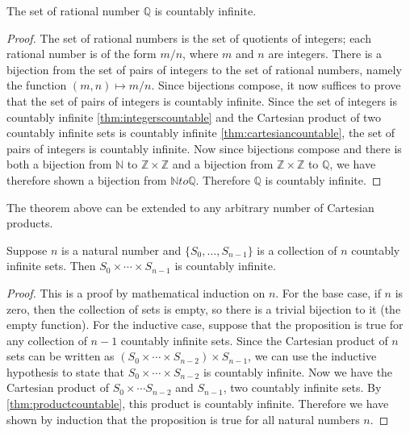 \begin{corollary}
  The set of rational number $\mathbb{Q}$ is countably infinite.
\end{corollary}
\begin{proof}
  The set of rational numbers is the set of quotients of integers; each rational number is of the form $m / n$, where $m$ and $n$ are integers.
  There is a bijection from the set of pairs of integers to the set of rational numbers, namely the function $(m, n) \mapsto m / n$.
  Since bijections compose, it now suffices to prove that the set of pairs of integers is countably infinite.
  Since the set of integers is countably infinite \autoref{thm:integerscountable} and the Cartesian product of two countably infinite sets is countably infinite \autoref{thm:cartesiancountable}, the set of pairs of integers is countably infinite.
  Now since bijections compose and there is both a bijection from $\mathbb{N}$ to $\mathbb{Z} \times \mathbb{Z}$ and a bijection from $\mathbb{Z} \times \mathbb{Z}$ to $\mathbb{Q}$, we have therefore shown a bijection from $\mathbb{N} to \mathbb{Q}$.
  Therefore $\mathbb{Q}$ is countably infinite.
\end{proof}

The theorem above can be extended to any arbitrary number of Cartesian products.

\begin{theorem}
  Suppose $n$ is a natural number and $\{S_0, \dotsc, S_{n - 1}\}$ is a collection of $n$ countably infinite sets.
  Then $S_0 \times \dotsb \times S_{n - 1}$ is countably infinite.
\end{theorem}
\begin{proof}
  This is a proof by mathematical induction on $n$.
  For the base case, if $n$ is zero, then the collection of sets is empty, so there is a trivial bijection to it (the empty function).
  For the inductive case, suppose that the proposition is true for any collection of $n - 1$ countably infinite sets.
  Since the Cartesian product of $n$ sets can be written as $(S_0 \times \dotsb \times S_{n - 2}) \times S_{n - 1}$, we can use the inductive hypothesis to state that $S_0 \times \dotsb \times S_{n - 2}$ is countably infinite.
  Now we have the Cartesian product of $S_0 \times \dotsb S_{n - 2}$ and $S_{n - 1}$, two countably infinite sets.
  By \autoref{thm:productcountable}, this product is countably infinite.
  Therefore we have shown by induction that the proposition is true for all natural numbers $n$.
\end{proof}

